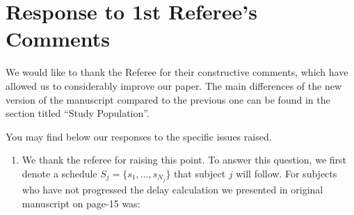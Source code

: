 \clearpage
\section*{Response to 1st Referee's Comments}
We would like to thank the Referee for their constructive comments, which have allowed us to considerably improve our paper. The main differences of the new version of the manuscript compared to the previous one can be found in the section titled ``Study Population''.

You may find below our responses to the specific issues raised.

\begin{enumerate}

\item \textbf{\color{blue}{One major concern centers on the true time of progression $T^*_j$, which is only known in simulation but unknown in real applications. As on P20, it says that ``Due to the periodical nature of schedules, the actual time delay in detecting progression cannot be observed in real-world surveillance''. Hence, it is only known that $T^*_j$ is located between two scheduled visits (i.e., subject to interval censoring) and its exact time is unknown. In this case, how to calculate the expected time delay in detecting progression?}}

We thank the referee for raising this point. To answer this question, we first denote a schedule $S_j = \{s_1, \ldots, s_{N_j}\}$ that subject $j$ will follow. For subjects who have not progressed the delay calculation we presented in original manuscript on page-15 was:


\end{enumerate}
